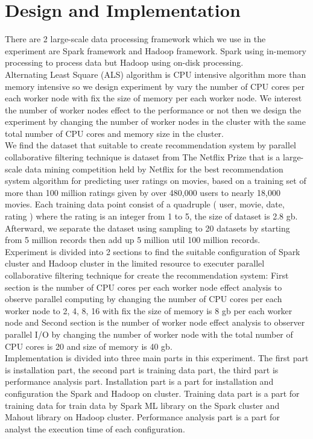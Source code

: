 \documentclass[conference]{IEEEtran}
\begin{document}
\section{Design and Implementation}
There are 2 large-scale data processing framework which we use in the experiment are Spark framework and Hadoop framework. Spark using in-memory processing to process data but Hadoop using on-disk processing. \\
\indent  Alternating Least Square (ALS) algorithm is CPU intensive algorithm more than memory intensive so we design experiment by vary the number of CPU cores per each worker node with fix the size of memory per each worker node. We interest the number of worker nodes effect to the performance or not then we design the experiment by changing the number of worker nodes in the cluster with the same total number of CPU cores and memory size in the cluster. \\
\indent We find the dataset that suitable to create recommendation system by parallel collaborative filtering technique is dataset from The Netflix Prize that is a large-scale data mining competition held by Netflix for the best recommendation system algorithm for predicting user ratings on movies, based on a training set of more than 100 million ratings given by over 480,000 users to nearly 18,000 movies. Each training data point consist of a quadruple ( user, movie, date, rating ) where the rating is an integer from 1 to 5, the size of dataset is 2.8 gb. Afterward, we separate the dataset using sampling to 20 datasets by starting from 5 million records then add up 5 million util 100 million records. \\
\indent Experiment is divided into 2 sections to find the suitable configuration of Spark cluster and Hadoop cluster in the limited resource to executer parallel collaborative filtering technique for create the recommendation system: First section is the number of CPU cores per each worker node effect analysis to observe parallel computing by changing the number of CPU cores per each worker node to 2, 4, 8, 16 with fix the size of memory is 8 gb per each worker node and Second section is the number of worker node effect analysis to observer parallel I/O by changing the number of worker node with the total number of CPU cores is 20 and size of memory is  40 gb. \\
\indent Implementation is divided into three main parts in this experiment. The first part is installation part, the second part is training data part, the third part is performance analysis part. Installation part is a  part for installation and configuration the Spark and Hadoop on cluster. Training data part is a part for training data  for train data by Spark ML library on the Spark cluster and Mahout library on Hadoop cluster.  Performance analysis part is a part for analyst the execution time of each configuration. 
\end{document}
